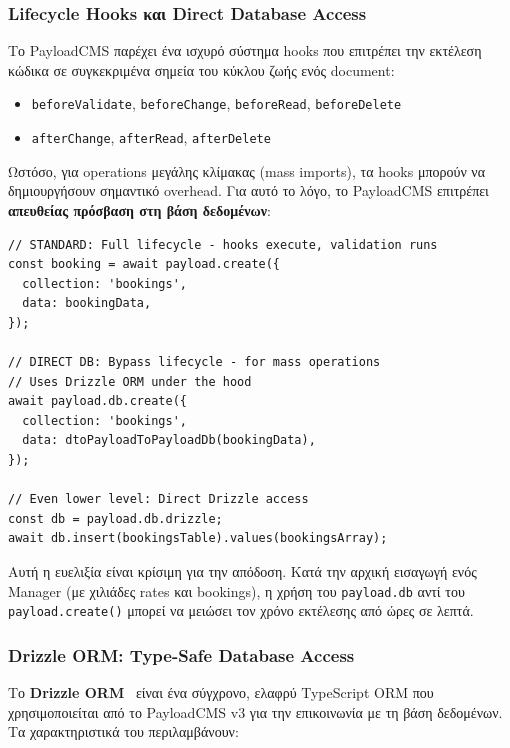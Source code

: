 \documentclass[
	12pt, %
	oneside, %
	greek,
	onehalfspacing, %
	liststotoc, %
	toctotoc, %
	parskip, %
	headsepline, %
]{MastersDoctoralThesis} %
\newcommand{\code}[1]{\texttt{#1}}
\begin{document}
\subsubsection{Lifecycle Hooks και Direct Database Access}
\label{subsubsec:lifecycle-hooks}

Το PayloadCMS παρέχει ένα ισχυρό σύστημα hooks που επιτρέπει την εκτέλεση κώδικα σε συγκεκριμένα σημεία του κύκλου ζωής ενός document:

\begin{itemize}
    \item \code{beforeValidate}, \code{beforeChange}, \code{beforeRead}, \code{beforeDelete}
    \item \code{afterChange}, \code{afterRead}, \code{afterDelete}
\end{itemize}

Ωστόσο, για operations μεγάλης κλίμακας (mass imports), τα hooks μπορούν να δημιουργήσουν σημαντικό overhead. Για αυτό το λόγο, το PayloadCMS επιτρέπει \textbf{απευθείας πρόσβαση στη βάση δεδομένων}:

\begin{lstlisting}[caption={Standard Lifecycle vs Direct Database Access}]
// STANDARD: Full lifecycle - hooks execute, validation runs
const booking = await payload.create({
  collection: 'bookings',
  data: bookingData,
});

// DIRECT DB: Bypass lifecycle - for mass operations
// Uses Drizzle ORM under the hood
await payload.db.create({
  collection: 'bookings',
  data: dtoPayloadToPayloadDb(bookingData),
});

// Even lower level: Direct Drizzle access
const db = payload.db.drizzle;
await db.insert(bookingsTable).values(bookingsArray);
\end{lstlisting}

Αυτή η ευελιξία είναι κρίσιμη για την απόδοση. Κατά την αρχική εισαγωγή ενός Manager (με χιλιάδες rates και bookings), η χρήση του \code{payload.db} αντί του \code{payload.create()} μπορεί να μειώσει τον χρόνο εκτέλεσης από ώρες σε λεπτά.

\subsubsection{Drizzle ORM: Type-Safe Database Access}
\label{subsubsec:drizzle-orm}

Το \textbf{Drizzle ORM}~\cite{drizzle} είναι ένα σύγχρονο, ελαφρύ TypeScript ORM που χρησιμοποιείται από το PayloadCMS v3 για την επικοινωνία με τη βάση δεδομένων. Τα χαρακτηριστικά του περιλαμβάνουν:
\end{document}
